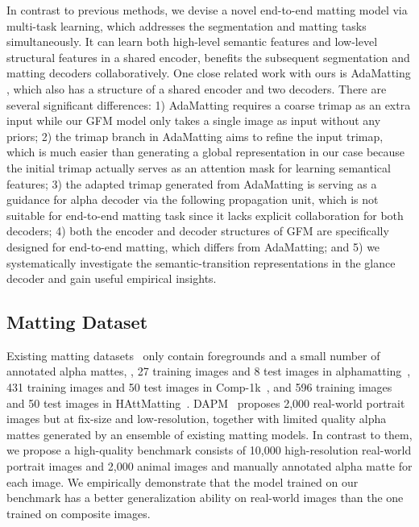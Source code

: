 \documentclass[twocolumn]{svjour3}
\begin{document}
In contrast to previous methods, we devise a novel end-to-end matting model via multi-task learning, which addresses the segmentation and matting tasks simultaneously. It can learn both high-level semantic features and low-level structural features in a shared encoder, benefits the subsequent segmentation and matting decoders collaboratively. One close related work with ours is AdaMatting \citep{cai2019disentangled}, which also has a structure of a shared encoder and two decoders. There are several significant differences: 1) AdaMatting requires a coarse trimap as an extra input while our GFM model only takes a single image as input without any priors; 2) the trimap branch in AdaMatting aims to refine the input trimap, which is much easier than generating a global representation in our case because the initial trimap actually serves as an attention mask for learning semantical features; 3) the adapted trimap generated from AdaMatting is serving as a guidance for alpha decoder via the following propagation unit, which is not suitable for end-to-end matting task since it lacks explicit collaboration for both decoders; 4) both the encoder and decoder structures of GFM are specifically designed for end-to-end matting, which differs from AdaMatting; and 5) we systematically investigate the semantic-transition representations in the glance decoder and gain useful empirical insights.


\subsection{Matting Dataset} 
Existing matting datasets~\citep{rhemann2009perceptually,xu2017deep,zhang2019late,Qiao_2020_CVPR} only contain foregrounds and a small number of annotated alpha mattes, , 27 training images and 8 test images in alphamatting~\citep{rhemann2009perceptually}, 431 training images and 50 test images in Comp-1k~\citep{xu2017deep}, and 596 training images and 50 test images in HAttMatting~\citep{Qiao_2020_CVPR}. DAPM~\citep{shen2016deep} proposes 2,000 real-world portrait images but at fix-size and low-resolution, together with limited quality alpha mattes generated by an ensemble of existing matting models. In contrast to them, we propose a high-quality benchmark consists of 10,000 high-resolution real-world portrait images and 2,000 animal images and manually annotated alpha matte for each image. We empirically demonstrate that the model trained on our benchmark has a better generalization ability on real-world images than the one trained on composite images.
\end{document}
